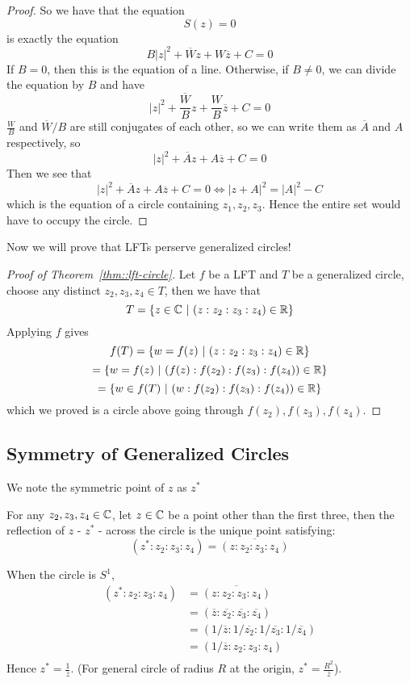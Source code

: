 \begin{proof}
    So we have that the equation \[S(z) = 0\] is exactly the equation
    \[B |z|^2 + \overline{W} z + W \overline{z} + C = 0\]
    If $B = 0$, then this is the equation of a line. Otherwise, if $B \neq 0$, we can divide the equation by $B$ and have
    \[|z|^2 + \frac{\overline{W}}{B} z + \frac{W}{B} \overline{z} + C = 0\]
    $\frac{W}{B}$ and $\overline{W}/B$ are still conjugates of each other, so we can write them as $\overline{A}$ and $A$ respectively, so
    \[|z|^2 + \overline{A} z + A \overline{z} + C = 0\]
    Then we see that
    \[|z|^2 + \overline{A} z + A \overline{z} + C = 0 \iff |z + A|^2 = |A|^2 - C\]
    which is the equation of a circle containing $z_1, z_2, z_3$. Hence the entire set would have to occupy the circle.
\end{proof}

Now we will prove that LFTs perserve generalized circles!

\begin{proof}[Proof of Theorem~\ref{thm::lft-circle}]
    Let $f$ be a LFT and $T$ be a generalized circle, choose any distinct $z_2, z_3, z_4 \in T$, then we have that
    \[T = \{z \in \mathbb{C}\ |\ (z: z_2: z_3: z_4) \in \mathbb{R}\}\]
    Applying $f$ gives
    \[f(T) = \{w = f(z)\ |\ (z: z_2: z_3: z_4) \in \mathbb{R}\}\]
    \[= \{w = f(z)\ |\ (f(z): f(z_2): f(z_3): f(z_4)) \in \Rbb\}\]
    \[= \{w \in f(T)\ |\ (w: f(z_2): f(z_3): f(z_4)) \in \mathbb{R}\}\]
    which we proved is a circle above going through $f(z_2), f(z_3), f(z_4)$.
\end{proof}

\subsection{Symmetry of Generalized Circles}

We note the symmetric point of $z$ as $z^*$

\begin{definition}
    For any $z_2, z_3, z_4 \in \mathbb{C}$, let $z \in \mathbb{C}$ be a point other than the first three, then the reflection of $z$ - $z^*$ - across the circle is the unique point satisfying:
    \[(z^*: z_2: z_3: z_4) = \overline{(z: z_2: z_3: z_4)}\]
\end{definition}

\begin{example}
    When the circle is $S^1$, 
    \begin{align*}
        (z^*: z_2: z_3: z_4) &= \overline{(z: z_2: z_3: z_4)}\\
        &= (\overline{z}: \overline{z_2}: \overline{z_3}: \overline{z_4})\\
        &= (1/\overline{z} : 1/\overline{z_2} : 1/\overline{z_3} : 1/\overline{z_4})\\
        &= (1/\overline{z} : z_2 : z_3 : z_4)\\
    \end{align*}
    Hence $z^* = \frac{1}{\overline{z}}$. (For general circle of radius $R$ at the origin, $z^* = \frac{R^2}{\overline{z}}$).
\end{example}

